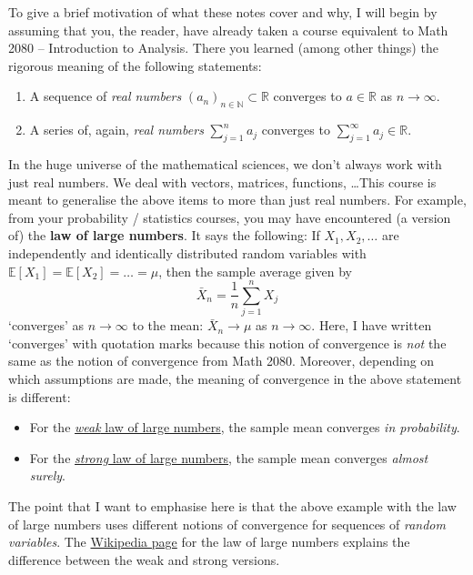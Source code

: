 \documentclass[12pt]{book}
\newcommand{\R}{\mathbb{R}}
\newcommand{\N}{\mathbb{N}}
\theoremstyle{remark}
\theoremstyle{definition}
\begin{document}
	To give a brief motivation of what these notes cover and why, I will begin by assuming that you, the reader, have already taken a course equivalent to Math 2080 -- Introduction to Analysis. There you learned (among other things) the rigorous meaning of the following statements:
	\begin{enumerate}
		\item A sequence of \textit{real numbers} $(a_n)_{n\in\N}\subset \R$ converges to $a\in\R$ as $n\to \infty$.
		\item A series of, again, \textit{real numbers} $\sum_{j=1}^na_j$ converges to $\sum_{j=1}^\infty a_j\in\R$.
	\end{enumerate}
	In the huge universe of the mathematical sciences, we don't always work with just real numbers. We deal with vectors, matrices, functions, \dots This course is meant to generalise the above items to more than just real numbers. For example, from your probability / statistics courses, you may have encountered (a version of) the \textbf{law of large numbers}. It says the following: If $X_1,X_2,\dots$ are independently and identically distributed random variables with $\mathbb{E}[X_1] = \mathbb{E}[X_2]=\dots = \mu$, then the sample average given by
	\[
	\bar{X}_n = \frac{1}{n}\sum_{j=1}^nX_j
	\]
	`converges' as $n\to \infty$ to the mean: $\bar{X}_n \to \mu$ as $n\to \infty$. Here, I have written `converges' with quotation marks because this notion of convergence is \textit{not} the same as the notion of convergence from Math 2080. Moreover, depending on which assumptions are made, the meaning of convergence in the above statement is different:
	\begin{itemize}
		\item For the \href{https://en.wikipedia.org/wiki/Law_of_large_numbers#Weak_law}{\textit{weak} law of large numbers}, the sample mean converges \textit{in probability}.
		\item For the \href{https://en.wikipedia.org/wiki/Law_of_large_numbers#Strong_law}{\textit{strong} law of large numbers}, the sample mean converges \textit{almost surely}.
	\end{itemize}
	The point that I want to emphasise here is that the above example with the law of large numbers uses different notions of convergence for sequences of \textit{random variables}. The \href{https://en.wikipedia.org/wiki/Law_of_large_numbers#Differences_between_the_weak_law_and_the_strong_law}{Wikipedia page} for the law of large numbers explains the difference between the weak and strong versions.
	
\end{document}

